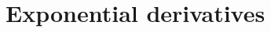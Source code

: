 \documentclass[../book/calcnotes.tex]{subfiles}
\begin{document}
\section{Exponential derivatives}
\label{sec:derivs.exp}

\begin{exercises}
\end{exercises}
\end{document}
